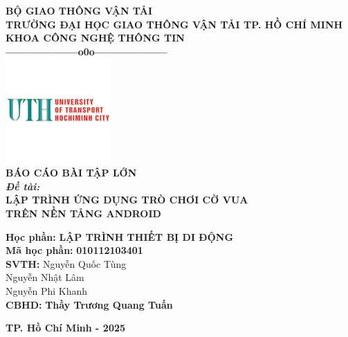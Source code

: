 \documentclass[a4paper,12pt]{article}
\begin{document}
\thispagestyle{empty} %
\begin{center}
    \textbf{BỘ GIAO THÔNG VẬN TẢI}\\
    \textbf{TRƯỜNG ĐẠI HỌC GIAO THÔNG VẬN TẢI TP. HỒ CHÍ MINH}\\
    \textbf{KHOA CÔNG NGHỆ THÔNG TIN}\\
    \textbf{--------------------o0o--------------------}\\[1.5cm]

    \includegraphics[width=0.3\textwidth]{img/logo_uth.png}\\[1.5cm]

    \textbf{\LARGE BÁO CÁO BÀI TẬP LỚN}\\[1cm]

    \textbf{\large \textit{Đề tài:}}\\[0.5cm]
    \textbf{\Large LẬP TRÌNH ỨNG DỤNG TRÒ CHƠI CỜ VUA}\\[0.2cm]
    \textbf{\Large TRÊN NỀN TẢNG ANDROID}\\[1cm]

    \begin{flushleft}
        \textbf{\large Học phần:} \textbf{LẬP TRÌNH THIẾT BỊ DI ĐỘNG}\\[0.5cm]
        \textbf{\large Mã học phần:} \textbf{010112103401}\\[1cm]

        \hspace{5cm}\textbf{\large SVTH:}
        \hspace{0cm} Nguyễn Quốc Tùng\\
        \hspace{6.9cm} Nguyễn Nhật Lâm\\
        \hspace{6.9cm} Nguyễn Phi Khanh\\[1cm]

        \hspace{5cm}\textbf{\large CBHD:} \textbf{Thầy Trương Quang Tuấn}\\[2cm]
    \end{flushleft}

    \textbf{TP. Hồ Chí Minh - 2025}
\end{center}
\end{document}
